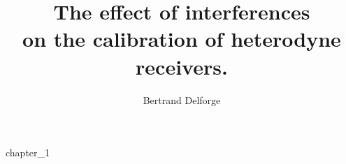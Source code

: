 \documentclass[a4paper,11pt]{book}
\title{
    The effect of interferences\\
    on the calibration of heterodyne receivers.\\
}
\author{Bertrand Delforge}
\newif\ifDraft
\begin{document}
\frontmatter
\ifDraft
    \renewcommand*\contentsname{Content \today}
\fi
\tableofcontents

\newpage


\mainmatter

{chapter_1}







\backmatter

%


\end{document}
